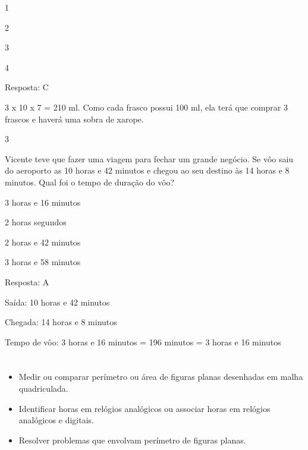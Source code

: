 \begin{escolha}
\begin{escolha}

\item
  1
\item
  2
\item
  3
\item
  4
\end{escolha}

Resposta: C

3 x 10 x 7 = 210 ml. Como cada frasco possui 100 ml, ela terá que
comprar 3 frascos e haverá uma sobra de xarope.

\num{3}

Vicente teve que fazer uma viagem para fechar um grande negócio. Se vôo
saiu do aeroporto as 10 horas e 42 minutos e chegou ao seu destino às 14
horas e 8 minutos. Qual foi o tempo de duração do vôo?

\begin{escolha}

\item
  3 horas e 16 minutos
\item
  2 horas segundos
\item
  2 horas e 42 minutos
\item
  3 horas e 58 minutos
\end{escolha}

Resposta: A

Saída: 10 horas e 42 minutos

Chegada: 14 horas e 8 minutos

Tempo de vôo: 3 horas e 16 minutos = 196 minutos = 3 horas e 16 minutos

\chapter{}



\begin{itemize}
    \item Medir ou comparar perímetro ou área de figuras planas desenhadas em
malha quadriculada.

    \item Identificar horas em relógios analógicos ou associar horas em relógios
analógicos e digitais.

    \item Resolver problemas que envolvam perímetro de figuras planas.


\end{itemize}
\end{escolha}
